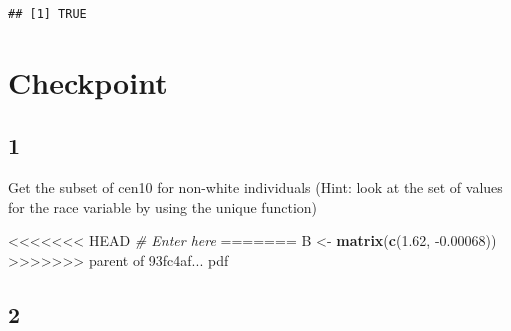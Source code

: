 \documentclass[]{book}
\newenvironment{Shaded}{\begin{snugshade}}{\end{snugshade}}
\newcommand{\CommentTok}[1]{\textcolor[rgb]{0.56,0.35,0.01}{\textit{#1}}}
\newcommand{\FloatTok}[1]{\textcolor[rgb]{0.00,0.00,0.81}{#1}}
\newcommand{\KeywordTok}[1]{\textcolor[rgb]{0.13,0.29,0.53}{\textbf{#1}}}
\newcommand{\NormalTok}[1]{#1}
\newcommand{\OperatorTok}[1]{\textcolor[rgb]{0.81,0.36,0.00}{\textbf{#1}}}
\newcommand{\StringTok}[1]{\textcolor[rgb]{0.31,0.60,0.02}{#1}}
\theoremstyle{definition}
\theoremstyle{definition}
\theoremstyle{definition}
\theoremstyle{remark}
\begin{document}
\begin{Shaded}
\begin{Highlighting}[]
\begin{Shaded}
\begin{Highlighting}[]
\begin{Shaded}
\end{Shaded}

\begin{verbatim}
## [1] TRUE
\end{verbatim}

\hypertarget{checkpoint}{%
\section*{Checkpoint}\label{checkpoint}}

\hypertarget{section-6}{%
\subsection*{1}\label{section-6}}

Get the subset of cen10 for non-white individuals (Hint: look at the set of values for the race variable by using the unique function)

\begin{Shaded}
\begin{Highlighting}[]
<<<<<<< HEAD
\CommentTok{\# Enter here}
=======
\NormalTok{B <-}\StringTok{ }\KeywordTok{matrix}\NormalTok{(}\KeywordTok{c}\NormalTok{(}\FloatTok{1.62}\NormalTok{, }\FloatTok{-0.00068}\NormalTok{))}
>>>>>>> parent of 93fc4af... pdf
\end{Highlighting}
\end{Shaded}

\hypertarget{section-7}{%
\subsection*{2}\label{section-7}}


\end{Highlighting}
\end{Shaded}
\end{Highlighting}
\end{Shaded}
\end{document}
